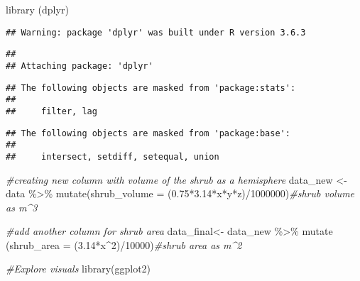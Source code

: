\documentclass[
]{article}
\newenvironment{Shaded}{\begin{snugshade}}{\end{snugshade}}
\newcommand{\AttributeTok}[1]{\textcolor[rgb]{0.77,0.63,0.00}{#1}}
\newcommand{\CommentTok}[1]{\textcolor[rgb]{0.56,0.35,0.01}{\textit{#1}}}
\newcommand{\DecValTok}[1]{\textcolor[rgb]{0.00,0.00,0.81}{#1}}
\newcommand{\FloatTok}[1]{\textcolor[rgb]{0.00,0.00,0.81}{#1}}
\newcommand{\FunctionTok}[1]{\textcolor[rgb]{0.00,0.00,0.00}{#1}}
\newcommand{\NormalTok}[1]{#1}
\newcommand{\OtherTok}[1]{\textcolor[rgb]{0.56,0.35,0.01}{#1}}
\newcommand{\SpecialCharTok}[1]{\textcolor[rgb]{0.00,0.00,0.00}{#1}}
\begin{document}
\begin{Shaded}
\begin{Highlighting}[]
\FunctionTok{library}\NormalTok{ (dplyr)}
\end{Highlighting}
\end{Shaded}

\begin{verbatim}
## Warning: package 'dplyr' was built under R version 3.6.3
\end{verbatim}

\begin{verbatim}
## 
## Attaching package: 'dplyr'
\end{verbatim}

\begin{verbatim}
## The following objects are masked from 'package:stats':
## 
##     filter, lag
\end{verbatim}

\begin{verbatim}
## The following objects are masked from 'package:base':
## 
##     intersect, setdiff, setequal, union
\end{verbatim}

\begin{Shaded}
\begin{Highlighting}[]
\CommentTok{\#creating new column with volume of the shrub as a hemisphere}
\NormalTok{data\_new }\OtherTok{\textless{}{-}}\NormalTok{data }\SpecialCharTok{\%\textgreater{}\%} \FunctionTok{mutate}\NormalTok{(}\AttributeTok{shrub\_volume =}\NormalTok{ (}\FloatTok{0.75}\SpecialCharTok{*}\FloatTok{3.14}\SpecialCharTok{*}\NormalTok{x}\SpecialCharTok{*}\NormalTok{y}\SpecialCharTok{*}\NormalTok{z)}\SpecialCharTok{/}\DecValTok{1000000}\NormalTok{)}\CommentTok{\#shrub volume as m\^{}3}

\CommentTok{\#add another column for shrub area}
\NormalTok{data\_final}\OtherTok{\textless{}{-}}\NormalTok{ data\_new }\SpecialCharTok{\%\textgreater{}\%} \FunctionTok{mutate}\NormalTok{ (}\AttributeTok{shrub\_area =}\NormalTok{ (}\FloatTok{3.14}\SpecialCharTok{*}\NormalTok{x}\SpecialCharTok{\^{}}\DecValTok{2}\NormalTok{)}\SpecialCharTok{/}\DecValTok{10000}\NormalTok{)}\CommentTok{\#shrub area as m\^{}2}
\end{Highlighting}
\end{Shaded}

\begin{Shaded}
\begin{Highlighting}[]
\CommentTok{\#Explore visuals }
\FunctionTok{library}\NormalTok{(ggplot2)}
\end{Highlighting}
\end{Shaded}
\end{document}
